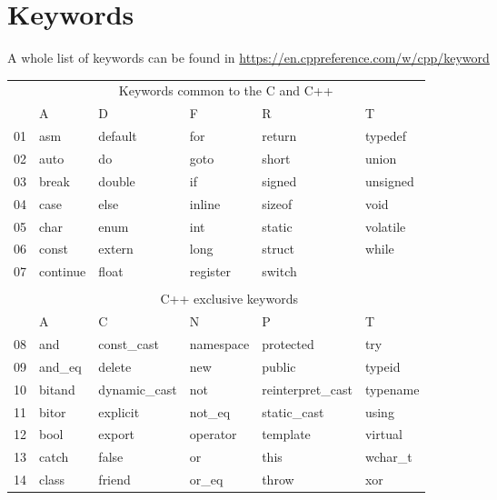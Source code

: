 \section{Keywords}
A whole list of keywords can be found in \url{https://en.cppreference.com/w/cpp/keyword}

\begin{table}[!h]
\centering
\begin{tabular}{|l|l|l|l|l|l|} 
\hhline{~-----|}
\multicolumn{1}{l|}{} & \multicolumn{5}{c|}{{\cellcolor[rgb]{1,0.741,0.267}}Keywords common to the C and C++~} \\ 
\cline{2-6}
\multicolumn{1}{l|}{} & A & D & F & R & T \\ 
\hline
01 & asm & default & for & return & typedef \\
\rowcolor[rgb]{0.753,0.753,0.753} 02 & auto & do & goto & short & union \\
03 & break & double & if & signed & unsigned \\
\rowcolor[rgb]{0.753,0.753,0.753} 04 & case & else & inline & sizeof & void \\
05 & char & enum & int & static & volatile \\
\rowcolor[rgb]{0.753,0.753,0.753} 06 & const & extern & long & struct & while \\
07 & continue & float & register & switch &  \\ 
\hline
\multicolumn{1}{l}{} & \multicolumn{1}{l}{} & \multicolumn{1}{l}{} & \multicolumn{1}{l}{} & \multicolumn{1}{l}{} & \multicolumn{1}{l}{} \\ 
\hhline{~-----|}
\multicolumn{1}{l|}{} & \multicolumn{5}{c|}{{\cellcolor[rgb]{1,0.741,0.267}}C++ exclusive keywords    } \\ 
\cline{2-6}
\multicolumn{1}{l|}{} & A & C & N & P & T \\ 
\hline
\rowcolor[rgb]{0.753,0.753,0.753} 08 & and & const\_cast & namespace & protected & try \\
09 & and\_eq & delete & new & public & typeid \\
\rowcolor[rgb]{0.753,0.753,0.753} 10 & bitand & dynamic\_cast & not & reinterpret\_cast & typename \\
11 & bitor & explicit & not\_eq & static\_cast & using \\
\rowcolor[rgb]{0.753,0.753,0.753} 12 & bool & export & operator & template & virtual \\
13 & catch & false & or & this & wchar\_t \\
\rowcolor[rgb]{0.753,0.753,0.753} 14 & class & friend & or\_eq & throw & xor \\

\end{tabular}
\end{table}
